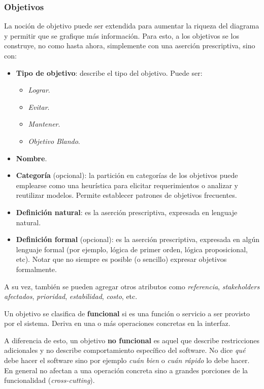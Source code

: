 \documentclass[]{article}
\begin{document}
\subsubsection{Objetivos}
La noción de objetivo puede ser extendida para aumentar la riqueza del diagrama y permitir que se grafique más información. Para esto, a los objetivos se los construye, no como hasta ahora, simplemente con una aserción prescriptiva, sino con:
\begin{itemize}
	\item \textbf{Tipo de objetivo}: describe el tipo del objetivo. Puede ser:
	\begin{itemize}
		\item \textit{Lograr}.
		\item \textit{Evitar}.
		\item \textit{Mantener}.
		\item \textit{Objetivo Blando}.
	\end{itemize}
	\item \textbf{Nombre}.
	\item \textbf{Categoría} (opcional): la partición en categorías de los objetivos puede emplearse como una heurística para elicitar requerimientos o analizar y reutilizar modelos. Permite establecer patrones de objetivos frecuentes.
	\item \textbf{Definición natural}: es la aserción prescriptiva, expresada en lenguaje natural.
	\item \textbf{Definición formal} (opcional): es la aserción prescriptiva, expresada en algún lenguaje formal (por ejemplo, lógica de primer orden, lógica proposicional, etc). Notar que no siempre es posible (o sencillo) expresar objetivos formalmente.
\end{itemize}

A su vez, también se pueden agregar otros atributos como \textit{referencia}, \textit{stakeholders afectados}, \textit{prioridad}, \textit{estabilidad}, \textit{costo}, etc.

Un objetivo se clasifica de \textbf{funcional} si es una función o servicio a ser provisto por el sistema. Deriva en una o más operaciones concretas en la interfaz.

A diferencia de esto, un objetivo \textbf{no funcional} es aquel que describe restricciones adicionales y no describe comportamiento específico del software. No dice \textit{qué} debe hacer el software sino por ejemplo \textit{cuán bien} o \textit{cuán rápido} lo debe hacer. En general no afectan a una operación concreta sino a grandes porciones de la funcionalidad (\textit{cross-cutting}).
~\newline
\end{document}

